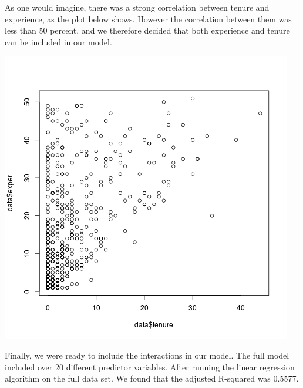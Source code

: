 \documentclass[12pt,a4paper,twoside]{article}
\begin{document}
As one would imagine, there was a strong correlation between tenure and experience, as the plot below shows. However the correlation between them was less than 50 percent, and we therefore decided that both experience and tenure can be included in our model.\\
\begin{center}
\includegraphics[scale=.3]{cor.png}
\end{center}

Finally, we were ready to include the interactions in our model. The full model included over 20 different predictor variables. After running the linear regression algorithm on the full data set. We found that the adjusted R-squared was 0.5577.
\end{document}
